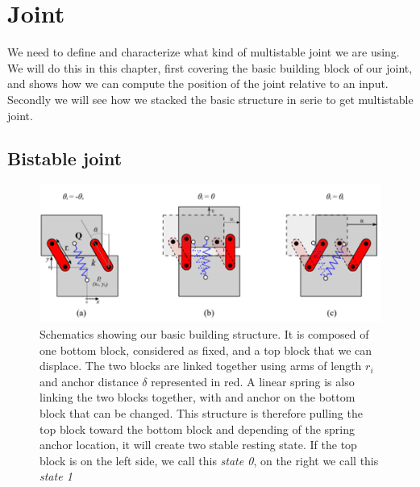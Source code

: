 \chapter{Joint}
    We need to define and characterize what kind of multistable joint we are using. We will do this in this chapter, first covering the basic building block of our joint, and shows how we can compute the position of the joint relative to an input. Secondly we will see how we stacked the basic structure in serie to get multistable joint. 
    
    \section{Bistable joint}
    \label{sec:bistable}
    \begin{figure}
        \centering
        \includegraphics[width=1.0\textwidth]{images/basics_building_blocks.png}
        \caption{Schematics showing our basic building structure. It is composed of one bottom block, considered as fixed, and a top block that we can displace. The two blocks are linked together using arms of length $r_i$ and anchor distance $\delta$ represented in red. A linear spring is also linking the two blocks together, with and anchor on the bottom block that can be changed. This structure is therefore pulling the top block toward the bottom block and depending of the spring anchor location, it will create two stable resting state. If the top block is on the left side, we call this \textit{state 0}, on the right we call this \textit{state 1}}
        \label{fig:joint_basics}
    \end{figure}
